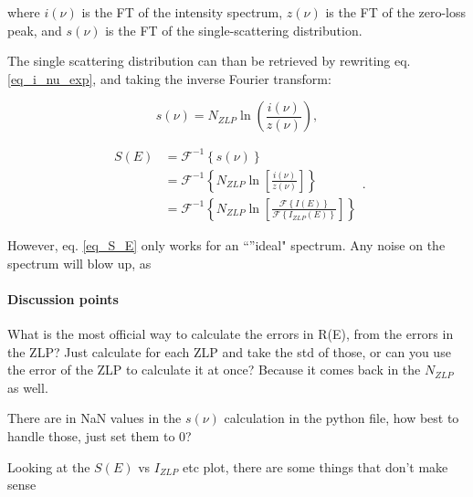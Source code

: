 where $i(\nu)$ is the FT of the intensity spectrum, $z(\nu)$ is the FT of the zero-loss peak, and $s(\nu)$ is the FT of the single-scattering distribution.


The single scattering distribution can than be retrieved by rewriting eq. \eqref{eq_i_nu_exp}, and taking the inverse Fourier transform:

\begin{equation}
    s(\nu) = N_{ZLP} \operatorname{ln}\left(\frac{i(\nu)}{z(\nu)}\right),
\end{equation}

\begin{equation}\label{eq_S_E}
    \begin{aligned}
    S(E) &= \mathcal{F}^{-1}\left\{s(\nu)\right\} \\
    &= \mathcal{F}^{-1}\left\{N_{ZLP}\operatorname{ln}\left[\frac{i(\nu)}{z(\nu)}\right]\right\} \\
    &= \mathcal{F}^{-1}\left\{N_{ZLP}\operatorname{ln}\left[\frac{\mathcal{F}\left\{I(E)\right\}}{\mathcal{F}\left\{I_{ZLP}(E)\right\}}\right]\right\}
    \end{aligned}.
\end{equation}


However, eq. \eqref{eq_S_E} only works for an ``''ideal" spectrum. Any noise on the spectrum will blow up, as 




\paragraph{Discussion points} What is the most official way to calculate the errors in R(E), from the errors in the ZLP? Just calculate for each ZLP and take the std of those, or can you use the error of the ZLP to calculate it at once? Because it comes back in the $N_{ZLP}$ as well.

There are in NaN values in the $s(\nu)$ calculation in the python file, how best to handle those, just set them to 0?

Looking at the $S(E)$ vs $I_{ZLP}$ etc plot, there are some things that don't make sense